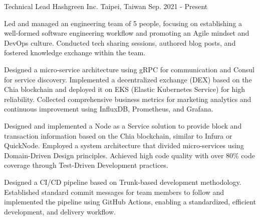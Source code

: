 

\begin{cventries}

\cventry
{Technical Lead} %
{Hashgreen Inc.} %
{Taipei, Taiwan} %
{Sep. 2021 - Present} %
{
  \begin{cvitems} %
    \item {Led and managed an engineering team of 5 people, focusing on establishing a well-formed software engineering workflow and promoting an Agile mindset and DevOps culture. Conducted tech sharing sessions, authored blog posts, and fostered knowledge exchange within the team.}
    \item {Designed a micro-service architecture using gRPC for communication and Consul for service discovery. Implemented a decentralized exchange (DEX) based on the Chia blockchain and deployed it on EKS (Elastic Kubernetes Service) for high reliability. Collected comprehensive business metrics for marketing analytics and continuous improvement using InfluxDB, Prometheus, and Grafana.}
    \item {Designed and implemented a Node as a Service solution to provide block and transaction information based on the Chia blockchain, similar to Infura or QuickNode. Employed a system architecture that divided micro-services using Domain-Driven Design principles. Achieved high code quality with over 80\% code coverage through Test-Driven Development practices.}
    \item {Designed a CI/CD pipeline based on Trunk-based development methodology. Established standard commit messages for team members to follow and implemented the pipeline using GitHub Actions, enabling a standardized, efficient development, and delivery workflow.}
  \end{cvitems}
}


\end{cventries}
